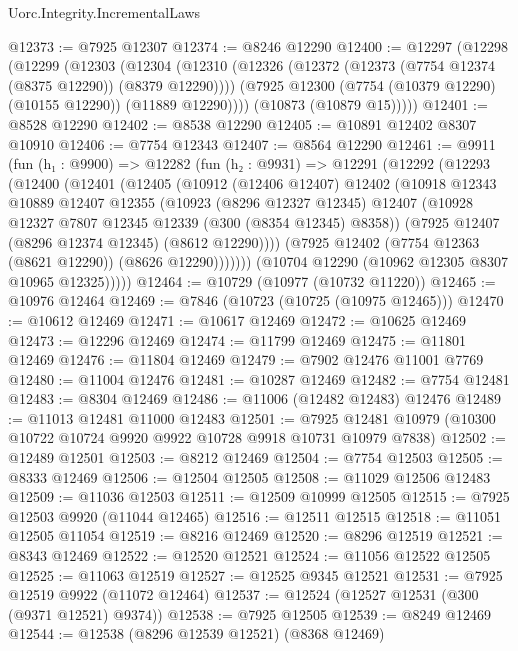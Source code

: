 \begin{lexlean}{Uorc.Integrity.IncrementalLaws}
\begin{coremodule}
@12373 := @7925 @12307
@12374 := @8246 @12290
@12400 := @12297
    (@12298
      (@12299
        (@12303
          (@12304
            (@12310
              (@12326 (@12372 (@12373 (@7754 @12374 (@8375 @12290)) (@8379 @12290))))
              (@7925 @12300 (@7754 (@10379 @12290) (@10155 @12290)) (@11889 @12290))))
          (@10873 (@10879 @15)))))
@12401 := @8528 @12290
@12402 := @8538 @12290
@12405 := @10891 @12402 @8307 @10910
@12406 := @7754 @12343
@12407 := @8564 @12290
@12461 := @9911
    (fun (h₁ : @9900) =>
    @12282
      (fun (h₂ : @9931) =>
      @12291
        (@12292
          (@12293
            (@12400
              (@12401
                (@12405
                  (@10912
                    (@12406 @12407)
                    @12402
                    (@10918
                      @12343
                      @10889
                      @12407
                      @12355
                      (@10923
                        (@8296 @12327 @12345)
                        @12407
                        (@10928 @12327 @7807 @12345 @12339 (@300 (@8354 @12345) @8358))
                        (@7925 @12407 (@8296 @12374 @12345) (@8612 @12290))))
                    (@7925 @12402 (@7754 @12363 (@8621 @12290)) (@8626 @12290)))))))
          (@10704 @12290 (@10962 @12305 @8307 @10965 @12325)))))
@12464 := @10729 (@10977 (@10732 @11220))
@12465 := @10976 @12464
@12469 := @7846 (@10723 (@10725 (@10975 @12465)))
@12470 := @10612 @12469
@12471 := @10617 @12469
@12472 := @10625 @12469
@12473 := @12296 @12469
@12474 := @11799 @12469
@12475 := @11801 @12469
@12476 := @11804 @12469
@12479 := @7902 @12476 @11001 @7769
@12480 := @11004 @12476
@12481 := @10287 @12469
@12482 := @7754 @12481
@12483 := @8304 @12469
@12486 := @11006 (@12482 @12483) @12476
@12489 := @11013 @12481 @11000 @12483
@12501 := @7925 @12481 @10979 (@10300 @10722 @10724 @9920 @9922 @10728 @9918 @10731 @10979 @7838)
@12502 := @12489 @12501
@12503 := @8212 @12469
@12504 := @7754 @12503
@12505 := @8333 @12469
@12506 := @12504 @12505
@12508 := @11029 @12506 @12483
@12509 := @11036 @12503
@12511 := @12509 @10999 @12505
@12515 := @7925 @12503 @9920 (@11044 @12465)
@12516 := @12511 @12515
@12518 := @11051 @12505 @11054
@12519 := @8216 @12469
@12520 := @8296 @12519
@12521 := @8343 @12469
@12522 := @12520 @12521
@12524 := @11056 @12522 @12505
@12525 := @11063 @12519
@12527 := @12525 @9345 @12521
@12531 := @7925 @12519 @9922 (@11072 @12464)
@12537 := @12524 (@12527 @12531 (@300 (@9371 @12521) @9374))
@12538 := @7925 @12505
@12539 := @8249 @12469
@12544 := @12538 (@8296 @12539 @12521) (@8368 @12469)

\end{coremodule}
\end{lexlean}
